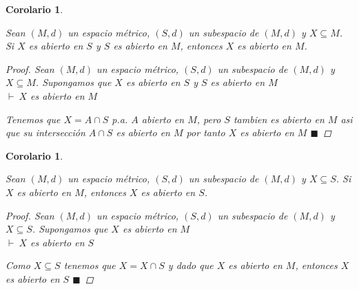 \documentclass[oneside]{book} %
\theoremstyle{Teorema}
\newtheorem{Corolario}[Definicion]{Corolario}
\theoremstyle{Ejemplos}
\theoremstyle{[Obs]}
\renewcommand{\{}{\left\lbrace} %
\renewcommand{\}}{\right\rbrace} %
\newcommand{\n}{\cap} %
\renewcommand{\sc}{\subseteq} %
\renewcommand{\qed}{$\blacksquare$} %
\newcommand{\pd}{$\vdash\ $} %
\begin{document}
			\begin{Corolario}\label{Corolario: Abierto en abierto es abierto}\setlength{\parindent}{0em}
				
				Sean $(M, d)$ un espacio métrico, $(S, d)$ un subespacio de $(M, d)$ y $X \sc M$. Si $X$ es abierto en $S$ y $S$ es abierto en $M$, entonces $X$ es abierto en $M$.

				\begin{proof}
					
					Sean $(M, d)$ un espacio métrico, $(S, d)$ un subespacio de $(M, d)$ y $X \sc M$. Supongamos que $X$ es abierto en $S$ y $S$ es abierto en $M$ \\
					\pd $X$ es abierto en $M$

					Tenemos que $X = A \n S$ p.a. $A$ abierto en $M$, pero $S$ tambien es abierto en $M$ asi que su intersección $A \n S$ es abierto en $M$ por tanto $X$ es abierto en $M$ \qed

				\end{proof}

			\end{Corolario}

			\begin{Corolario}\label{Corolario: Si es abierto en el grande entonces es abierto en el chico}\setlength{\parindent}{0em}
			
				Sean $(M, d)$ un espacio métrico, $(S, d)$ un subespacio de $(M, d)$ y $X \sc S$. Si $X$ es abierto en $M$, entonces $X$ es abierto en $S$.

				\begin{proof}
					
					Sean $(M, d)$ un espacio métrico, $(S, d)$ un subespacio de $(M, d)$ y $X \sc S$. Supongamos que $X$ es abierto en $M$ \\
					\pd $X$ es abierto en $S$ 

					Como $X \sc S$ tenemos que $X = X \n S$ y dado que $X$ es abierto en $M$, entonces $X$ es abierto en $S$ \qed

				\end{proof}

			\end{Corolario}
\end{document}
